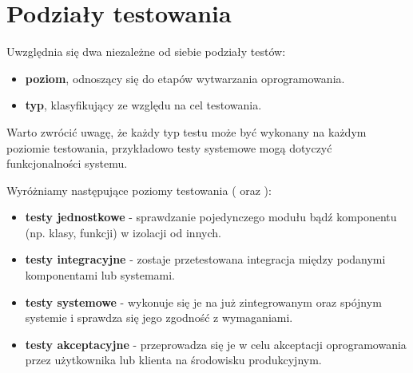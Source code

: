 \section{Podziały testowania}

Uwzględnia się dwa niezależne od siebie podziały testów: 
\begin{itemize}
    \item \textbf{poziom}, odnoszący się do etapów wytwarzania oprogramowania.
    \item \textbf{typ}, klasyfikujący ze względu na cel testowania.
\end{itemize}
  Warto zwrócić uwagę, że każdy typ testu może być wykonany na każdym poziomie testowania, przykładowo testy systemowe mogą dotyczyć funkcjonalności systemu.

\noindent Wyróżniamy następujące poziomy testowania (\cite{roman} oraz \cite{smiglin}):
\begin{itemize}
    \item \textbf{testy jednostkowe} - sprawdzanie pojedynczego modułu bądź komponentu (np. klasy, funkcji) w izolacji od innych.
    \item \textbf{testy integracyjne} - zostaje przetestowana integracja między podanymi komponentami lub systemami.
    \item \textbf{testy systemowe} - wykonuje się je na już zintegrowanym oraz spójnym systemie i sprawdza się jego zgodność z wymaganiami.
    \item \textbf{testy akceptacyjne} - przeprowadza się je w celu akceptacji oprogramowania przez użytkownika lub klienta na środowisku produkcyjnym.
\end{itemize}

